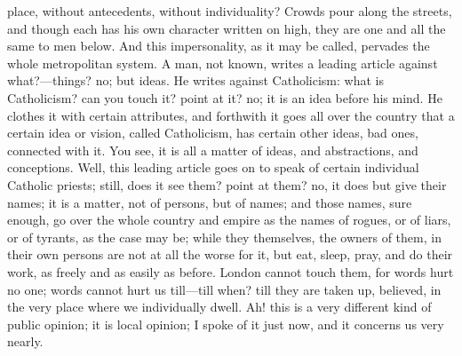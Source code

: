 place, without antecedents, without individuality? Crowds
pour along the streets, and though each has his own
character written on high, they are one and all the same
to men below. And this impersonality, as it may be
called, pervades the whole metropolitan system. A man,
not known, writes a leading article against
what?—things? no; but ideas. He writes against
Catholicism: what is Catholicism? can you touch it? point
at it? no; it is an idea before his mind. He clothes it
with certain attributes, and forthwith it goes all over
the country that a certain idea or vision, called
Catholicism, has certain other ideas, bad ones, connected
with it. You see, it is all a matter of ideas, and
abstractions, and conceptions. Well, this leading article
goes on to speak of certain individual Catholic priests;
still, does it see them? point at them? no, it does but
give their names; it is a matter, not of persons, but of
names; and those names, sure enough, go over the whole
country and empire as the names of rogues, or of liars,
or of tyrants, as the case may be; while they themselves,
the owners of them, in their own persons are not at all
the worse for it, but eat, sleep, pray, and do their
work, as freely and as easily as before. London cannot
touch them, for words hurt no one; words cannot hurt us
till—till when? till they are taken up, believed, in
the very place where we individually dwell. Ah! this is a
very different kind of public opinion; it is local
opinion; I spoke of it just now, and it concerns us very
nearly.

